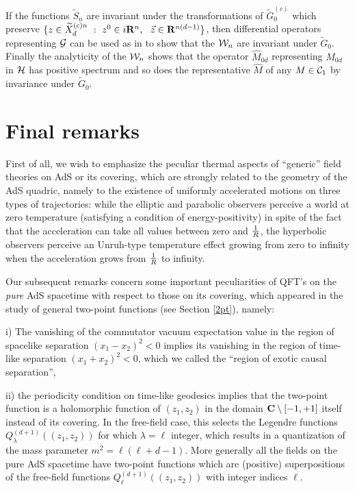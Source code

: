 \documentclass[a4paper,a4paper]{article}
\let\UnmodifSec=\section
\renewcommand{\section}{\setcounter{equation}{0}\UnmodifSec}
\def\bR{{\bf R}}
\def\CC{{\cal C}}
\def\GG{{\cal G}}
\def\HH{{\cal H}}
\def\WW{{\cal W}}
\def\wh{\widehat}
\def\wt{\widetilde}
\def\wXcdn{{\wt X_d^{(c)n}}}
\begin{document}
If the functions $\wt S_n$ are
invariant under the transformations of $\wt G_0^{(c)}$ which preserve
$\{z \in \wXcdn\ :\ z^0 \in i\bR^n,\ \ \vec{z} \in \bR^{n(d-1)}\}$,
then differential operators representing $\GG$ can be used as in
\cite{OS1} to show that the $\WW_n$ are invariant under $\wt G_0$.
Finally the analyticity of the $\WW_n$ shows that the operator
$\wh M_{0d}$ representing $M_{0d}$ in $\HH$ has positive spectrum
and so does the representative $\wh M$ of any $M \in \CC_1$ by invariance
under $\wt G_0$.


\section{Final remarks}
\label{O}

First of all, we wish to emphasize the peculiar thermal aspects of
``generic'' field theories on AdS or its covering,
which are strongly related to the
geometry of the AdS quadric, namely to the existence of
uniformly accelerated motions on three types of trajectories:
while the elliptic and parabolic observers perceive a
world at zero temperature (satisfying a condition
of energy-positivity)
in spite of the fact that the acceleration can take all values
between zero and $1\over R$, the hyperbolic observers
perceive an Unruh-type temperature effect growing from zero to
infinity when the acceleration grows from $1\over R$
to infinity.

Our subsequent remarks
concern some important peculiarities of QFT's on the {\sl pure} AdS
spacetime with respect to those on its covering, which appeared
in the study of general two-point functions
(see Section \ref{2pt}), namely:

i) The vanishing of the commutator vacuum expectation value in the region of
spacelike separation $(x_1 -x_2)^2 < 0$
implies its vanishing in the region of time-like separation
$(x_1 +x_2)^2 < 0$, which we called the ``region of
exotic causal separation'',

ii) the periodicity condition on time-like geodesics implies that
the two-point function is a holomorphic function of
$(z_1,z_2)$ in the domain ${\bf C} \setminus [-1,+1]$ itself
instead of its covering. In the free-field case, this selects
the Legendre functions $Q^{(d+1)}_{\lambda}((z_1,z_2))$ for which
$\lambda = \ell$ integer, which results in a quantization of the
mass parameter $m^2 = \ell(\ell +d-1)$.  More generally
all the fields on the pure AdS spacetime have
two-point functions which are (positive) superpositions
of the
free-field functions
$Q^{(d+1)}_{\ell}((z_1,z_2)) $ with integer indices $\ell$.
\end{document}
